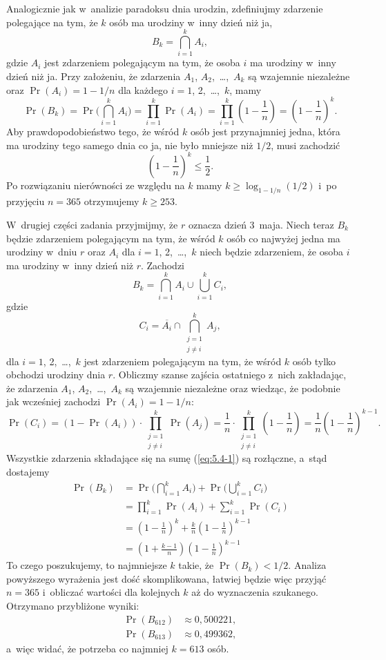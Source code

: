 \exercise %
Analogicznie jak w~analizie paradoksu dnia urodzin, zdefiniujmy zdarzenie polegające na tym, że $k$ osób ma urodziny w~inny dzień niż ja,
\[
	B_k = \bigcap_{i=1}^kA_i,
\]
gdzie $A_i$ jest zdarzeniem polegającym na tym, że osoba $i$ ma urodziny w~inny dzień niż ja. Przy założeniu, że zdarzenia $A_1$, $A_2$,~\dots,~$A_k$ są wzajemnie niezależne oraz $\Pr(A_i)=1-1/n$ dla każdego $i=1$, 2,~\dots,~$k$, mamy
\[
	\Pr(B_k) = \Pr\biggl(\bigcap_{i=1}^kA_i\biggr) = \prod_{i=1}^k\Pr(A_i) = \prod_{i=1}^k\left(1-\frac{1}{n}\right) = \left(1-\frac{1}{n}\right)^k.
\]
Aby prawdopodobieństwo tego, że wśród $k$ osób jest przynajmniej jedna, która ma urodziny tego samego dnia co ja, nie było mniejsze niż $1/2$, musi zachodzić
\[
	\left(1-\frac{1}{n}\right)^k \le \frac{1}{2}.
\]
Po rozwiązaniu nierówności ze względu na $k$ mamy $k\ge\log_{1-1/n}(1/2)$ i~po przyjęciu $n=365$ otrzymujemy $k\ge253$.

W~drugiej części zadania przyjmijmy, że $r$ oznacza dzień 3~maja. Niech teraz $B_k$ będzie zdarzeniem polegającym na tym, że wśród $k$ osób co najwyżej jedna ma urodziny w~dniu $r$ oraz $A_i$ dla $i=1$, 2,~\dots,~$k$ niech będzie zdarzeniem, że osoba $i$ ma urodziny w~inny dzień niż $r$. Zachodzi
\[
	B_k = \bigcap_{i=1}^kA_i\cup\bigcup_{i=1}^kC_i, \tag{$*$}\label{eq:5.4-1}
\]
gdzie
\[
	C_i = \overline{A_i}\cap\bigcap_{\substack{j=1\\j\ne i}}^kA_j,
\]
dla $i=1$, 2,~\dots,~$k$ jest zdarzeniem polegającym na tym, że wśród $k$ osób tylko  obchodzi urodziny dnia $r$. Obliczmy szanse zajścia ostatniego z~nich zakładając, że zdarzenia $A_1$, $A_2$,~\dots,~$A_k$ są wzajemnie niezależne oraz wiedząc, że podobnie jak wcześniej zachodzi $\Pr(A_i)=1-1/n$:
\[
	\Pr(C_i) = (1-\Pr(A_i))\cdot\prod_{\substack{j=1\\j\ne i}}^k\Pr(A_j) = \frac{1}{n}\cdot\prod_{\substack{j=1\\j\ne i}}^k\left(1-\frac{1}{n}\right) = \frac{1}{n}\left(1-\frac{1}{n}\right)^{k-1}.
\]
Wszystkie zdarzenia składające się na sumę (\ref{eq:5.4-1}) są rozłączne, a~stąd dostajemy
\begin{align*}
	\Pr(B_k) &= \Pr\biggl(\bigcap_{i=1}^kA_i\biggr)+\Pr\biggl(\bigcup_{i=1}^kC_i\biggr) \\
	&= \prod_{i=1}^k\Pr(A_i)+\sum_{i=1}^k\Pr(C_i) \\
	&= \left(1-\frac{1}{n}\right)^k+\frac{k}{n}\left(1-\frac{1}{n}\right)^{k-1} \\
	&= \left(1+\frac{k-1}{n}\right)\left(1-\frac{1}{n}\right)^{k-1}
\end{align*}
To czego poszukujemy, to najmniejsze $k$ takie, że $\Pr(B_k)<1/2$. Analiza powyższego wyrażenia jest dość skomplikowana, łatwiej będzie więc przyjąć $n=365$ i~obliczać wartości dla kolejnych $k$ aż do wyznaczenia szukanego. Otrzymano przybliżone wyniki:
\begin{align*}
	\Pr(B_{612}) &\approx 0{,}500221, \\
	\Pr(B_{613}) &\approx 0{,}499362,
\end{align*}
a~więc widać, że potrzeba co najmniej $k=613$ osób.

